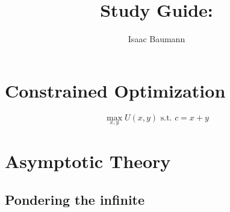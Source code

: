 \documentclass[a4paper]{article}
\begin{document}
\author{Isaac Baumann}
\title{Study Guide: \classnum}
\maketitle

\tableofcontents

\newpage

\section{Constrained Optimization}

\lipsum[1]

$$
\max_{x, y} U \left( x, y \right) \text{ s.t. } c = x + y
$$

\lipsum[2]

\newpage

\section{Asymptotic Theory}

\lipsum[3]

\subsection{Pondering the infinite}

\lipsum[4]
\end{document}
